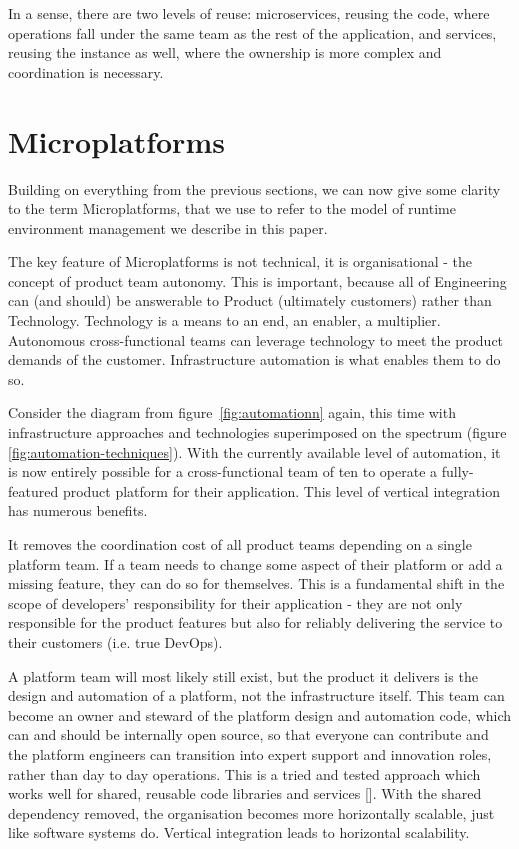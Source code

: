 \documentclass[reprint,amsmath,amssymb,aps]{revtex4-1}
\begin{document}
In a sense, there are two levels of reuse: microservices, reusing the code, where operations fall under the same team as the rest of the application, and services, reusing the instance as well, where the ownership is more complex and coordination is necessary.

\section{Microplatforms}
\label{sec:microplatforms}

Building on everything from the previous sections, we can now give some clarity to the term Microplatforms, that we use to refer to the model of runtime environment management we describe in this paper.

The key feature of Microplatforms is not technical, it is organisational - the concept of product team autonomy. This is important, because all of Engineering can (and should) be answerable to Product (ultimately customers) rather than Technology. Technology is a means to an end, an enabler, a multiplier. Autonomous cross-functional teams can leverage technology to meet the product demands of the customer. Infrastructure automation is what enables them to do so.

Consider the diagram from figure~\ref{fig:automationn} again, this time with infrastructure approaches and technologies superimposed on the spectrum (figure \ref{fig:automation-techniques}). With the currently available level of automation, it is now entirely possible for a cross-functional team of ten to operate a fully-featured product platform for their application. This level of vertical integration has numerous benefits.

It removes the coordination cost of all product teams depending on a single platform team. If a team needs to change some aspect of their platform or add a missing feature, they can do so for themselves. This is a fundamental shift in the scope of developers' responsibility for their application - they are not only responsible for the product features but also for reliably delivering the service to their customers (i.e. true DevOps).

A platform team will most likely still exist, but the product it delivers is the design and automation of a platform, not the infrastructure itself. This team can become an owner and steward of the platform design and automation code, which can and should be internally open source, so that everyone can contribute and the platform engineers can transition into expert support and innovation roles, rather than day to day operations. This is a tried and tested approach which works well for shared, reusable code libraries and services []. With the shared dependency removed, the organisation becomes more horizontally scalable, just like software systems do. Vertical integration leads to horizontal scalability.
\end{document}
